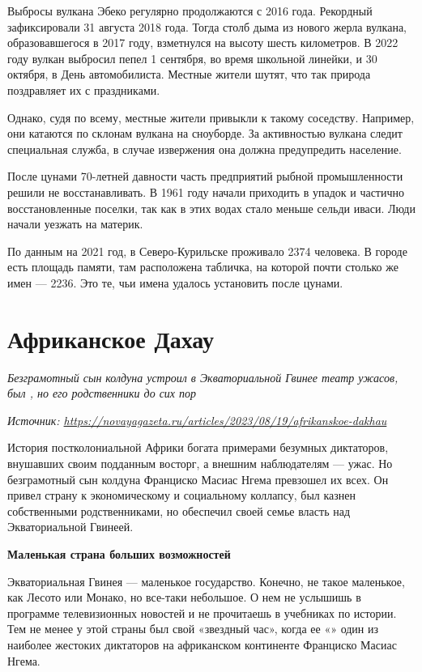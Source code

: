 Выбросы вулкана Эбеко регулярно продолжаются с 2016 года. Рекордный зафиксировали 31 августа 2018 года. Тогда столб дыма из нового жерла вулкана, образовавшегося в 2017 году, взметнулся на высоту шесть километров. В 2022 году вулкан выбросил пепел 1 сентября, во время школьной линейки, и 30 октября, в День автомобилиста. Местные жители шутят, что так природа поздравляет их с праздниками.

Однако, судя по всему, местные жители привыкли к такому соседству. Например, они катаются по склонам вулкана на сноуборде. За активностью вулкана следит специальная служба, в случае извержения она должна предупредить население.

После цунами 70-летней давности часть предприятий рыбной промышленности решили не восстанавливать. В 1961 году начали приходить в упадок и частично восстановленные поселки, так как в этих водах стало меньше сельди иваси. Люди начали уезжать на материк.

По данным на 2021 год, в Северо-Курильске проживало 2374 человека. В городе есть площадь памяти, там расположена табличка, на которой почти столько же имен --- 2236. Это те, чьи имена удалось установить после цунами.

\newpage




\section{Африканское Дахау}

\textit{Безграмотный сын колдуна устроил в Экваториальной Гвинее театр ужасов, был , но его родственники  до сих пор}

\textit{Источник: \url{https://novayagazeta.ru/articles/2023/08/19/afrikanskoe-dakhau}}

История постколониальной Африки богата примерами безумных диктаторов, внушавших своим подданным восторг, а внешним наблюдателям --- ужас. Но безграмотный сын колдуна Франциско Масиас Нгема превзошел их всех. Он привел страну к экономическому и социальному коллапсу, был казнен собственными родственниками, но обеспечил своей семье власть над Экваториальной Гвинеей.

\textbf{Маленькая страна больших возможностей}

Экваториальная Гвинея --- маленькое государство. Конечно, не такое маленькое, как Лесото или Монако, но все-таки небольшое. О нем не услышишь в программе телевизионных новостей и не прочитаешь в учебниках по истории. Тем не менее у этой страны был свой «звездный час», когда ее «» один из наиболее жестоких диктаторов на африканском континенте Франциско Масиас Нгема.

